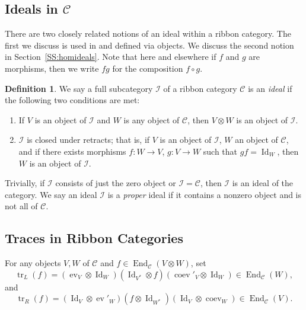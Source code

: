 \documentclass[12pt, reqno]{amsart}
\theoremstyle{definition}
\newtheorem{definition}[theorem]{Definition}
\newcommand{\End}{\operatorname{End}}
\newcommand{\tr}{\text{tr}\,}
\newcommand{\ev}{\operatorname{ev}}
\newcommand{\coev}{\operatorname{coev}}
\renewcommand{\1}{_{(1)}}
\renewcommand{\2}{_{(2)}}
\newcommand{\3}{_{(3)}}
\newcommand{\4}{_{(4)}}
\newcommand{\cat}{\mathcal{C}}
\newcommand{\ideal}{\mathcal{I}}
\newcommand{\Id}{\operatorname{Id}}
\renewcommand{\tr}{\operatorname{tr}}
\begin{document}
\subsection{Ideals in $\cat$}\label{SS:ideals} There are two closely related notions of an ideal within a ribbon category.  The first we discuss is used in \cite{GKP} and defined via objects.  We discuss the second notion in Section~\ref{SS:homideals}.   Note that here and elsewhere if $f$ and $g$ are morphisms, then we write $fg$ for the composition $f \circ g$.

\begin{definition}\label{D:ideal} We say a full subcategory $\ideal$ of a ribbon category $\cat$ is an \emph{ideal} if the following two conditions are met:
\begin{enumerate}
\item  If $V$ is an object of $\ideal$ and $W$ is any object of $\cat$, then $V\otimes W$ is an object of $\ideal$.
\item  $\ideal$ is closed under retracts; that is, if $V$ is an object of $\ideal$, $W$ an object of $\cat$, and if there exists morphisms $f:W \rightarrow V$, $g:V\rightarrow W$ such that $gf=\Id_W$, then $W$ is an object of $\ideal$.
\end{enumerate}
\end{definition} Trivially, if $\ideal$ consists of just the zero object or $\ideal = \cat$, then $\ideal$ is an ideal of the category.  We say an ideal $\ideal$ is a \emph{proper} ideal if it contains a nonzero object and is not all of $\cat$.


\subsection{Traces in Ribbon Categories}\label{SS:traces} For any objects $V,W$ of $\cat$ and $f \in \End_{\cat}( V \otimes W)$, set
\begin{equation}\label{E:trL}
\tr_{L}(f)=(\ev_{V}\otimes \Id_{W})(\Id_{V^{*}}\otimes
f)(\coev'_{V}\otimes \Id_{W}) \in \End_{\cat}(W),
\end{equation} and
\begin{equation}\label{E:trR}
\tr_{R}(f)=(\Id_{V}\otimes \ev'_{W})  (f \otimes \Id_{W^{*}})
(\Id_{V}\otimes \coev _{W}) \in \End_{\cat}(V).
\end{equation}
\end{document}
